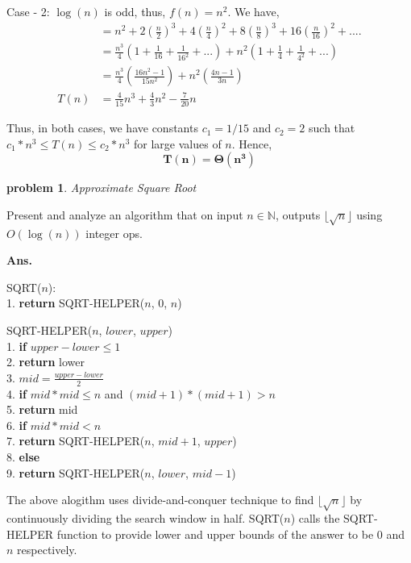 \documentclass[11pt]{article}
\newtheorem{problem}{\sc\color{cit}problem}
\begin{document}
Case - 2: $\log(n)$ is odd, thus, $f(n) = n^2$.
We have,
\begin{equation}
    \begin{split}
        & = n^2 + 2(\frac{n}{2})^3+4(\frac{n}{4})^2+8(\frac{n}{8})^3+16(\frac{n}{16})^2+....\\
        &= \frac{n^3}{4}\left(1+\frac{1}{16}+\frac{1}{16^2}+...\right) + n^2\left(1+\frac{1}{4}+\frac{1}{4^2}+...\right)\\
        &= \frac{n^3}{4}\left(\frac{16n^2-1}{15n^2}\right) + n^2\left(\frac{4n-1}{3n}\right)\\
        T(n) &= {\frac{4}{15}n^3 + \frac{4}{3}n^2 - \frac{7}{20}n}
    \end{split}
\end{equation}

Thus, in both cases, we have constants $c_1=1/15$ and $c_2=2$ such that $c_1*n^3 \leq T(n) \leq c_2*n^3$ for large values of $n$. Hence,
$$\mathbf{T(n) = \Theta(n^3)}$$
\newpage

\begin{problem}{Approximate Square Root}\end{problem}
Present and analyze an algorithm that on input $n\in\mathbb{N}$, outputs $\lfloor \sqrt{n} \rfloor$ using  $O(\log(n))$ integer ops.
 
 \hfill
   
\noindent \textbf{Ans.}

\noindent SQRT($n$):\\
1. \textbf{return} SQRT-HELPER($n$, $0$, $n$)

\hfill

\noindent SQRT-HELPER($n$, $lower$, $upper$)\\
1. \textbf{if} $upper - lower \leq 1$\\
2. \quad \textbf{return} lower\\
3. $mid = \frac{upper - lower}{2}$\\
4. \textbf{if} $mid*mid\leq n$ and $(mid+1)*(mid+1) > n$\\
5. \quad \textbf{return} mid\\
6. \textbf{if} $mid*mid < n$\\
7. \quad \textbf{return} SQRT-HELPER($n$, $mid+1$, $upper$)\\
8. \textbf{else}\\
9. \quad \textbf{return} SQRT-HELPER($n$, $lower$, $mid-1$)\\

\hfill

\noindent The above alogithm uses divide-and-conquer technique to find $\lfloor \sqrt{n} \rfloor$ by continuously dividing the search window in half. SQRT($n$) calls the SQRT-HELPER function to provide lower and upper bounds of the answer to be 0 and $n$ respectively.
\end{document}
